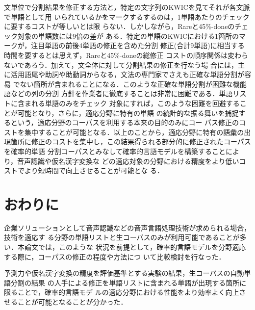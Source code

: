 文単位で分割結果を修正する方法と，特定の文字列のKWICを見てそれが各文脈で単語として用
いられているかをマークするするのは，1単語あたりのチェックに要するコストが等しいとは限
らない．しかしながら，Rareと45\%-doneのチェック対象の単語数には9倍の差が
ある．特定の単語のKWICにおける1箇所のマークが，注目単語の前後4単語の修正を含めた分割
修正(合計9単語)に相当する時間を要するとは思えず，Rareと45\%-doneの総修正
コストの順序関係は変わらないであろう．加えて，文全体に対して分割結果の修正を行なう場
合には，主に活用語尾や助詞や助動詞からなる，文法の専門家でさえも正確な単語分割が容易
でない箇所が含まれることになる．このような正確な単語分割が困難な機能語などの列の分割
方針を作業者に徹底することは非常に困難である．単語リストに含まれる単語のみをチェック
対象にすれば，このような困難を回避することが可能となり，さらに，適応分野に特有の単語
の統計的な振る舞いを捕捉するという，適応分野のコーパスを利用する本来の目的のみにコー
パス修正のコストを集中することが可能となる．以上のことから，適応分野に特有の語彙の出
現箇所に修正のコストを集中し，この結果得られる部分的に修正されたコーパスを確率的単語
分割コーパスとみなして確率的言語モデルを構築することにより，音声認識や仮名漢字変換な
どの適応対象の分野における精度をより低いコストでより短時間で向上させることが可能とな
る．

\section{おわりに}

企業ソリューションとして音声認識などの音声言語処理技術が求められる場合，技術を適応す
る分野の単語リストと生コーパスのみが利用可能であることが多い．本論文では，このような
状況を前提として，確率的言語モデルを分野適応する際に，コーパスの修正の程度や方法につ
いて比較検討を行なった．

予測力や仮名漢字変換の精度を評価基準とする実験の結果，生コーパスの自動単語分割の結果
の人手による修正を単語リストに含まれる単語が出現する箇所に限ることで，確率的言語モデ
ルの適応分野における性能をより効率よく向上させることが可能となることが分かった．

\begin{biography}
\end{biography}



